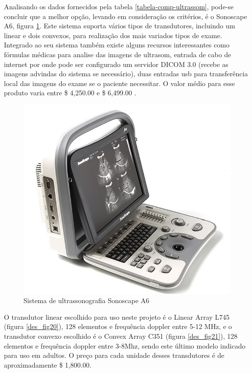 Analisando os dados fornecidos pela tabela \ref{tabela-comp-ultrassom}, pode-se concluir que a melhor opção, levando em consideração os critérios, é o Sonoscape A6, figura \ref{des_fig19}. Este sistema suporta vários tipos de transdutores, incluindo um linear e dois convexos, para realização dos mais variados tipos de exame. Integrado ao seu sistema também existe alguns recursos interessantes como fórmulas médicas para analise das imagens de ultrasom, entrada de cabo de internet por onde pode ser configurado um servidor DICOM 3.0 (recebe as imagens advindas do sistema se necessário), duas entradas usb para transferência local das imagens do exame se o paciente necessitar. O valor médio para esse produto varia entre \$ 4,250.00 e \$ 6,499.00 \cite{sonoscapea6}.
\begin{figure}[H]
	\centering	\includegraphics[keepaspectratio=true,scale=0.35]{figuras/sonoscapea6.jpg}
	\caption{Sistema de ultrassonografia Sonoscape A6}
	\label{des_fig19}
\end{figure}
O transdutor linear escolhido para uso neste projeto é o Linear Array L745 (figura \ref{des_fig20}), 128 elementos e frequência doppler entre 5-12 MHz,  e o transdutor convexo escolhido é o Convex Array C351 (figura \ref{des_fig21}), 128 elementos e frequência doppler entre 3-8Mhz, sendo este último modelo indicado para uso em adultos. O preço para cada unidade desses transdutores é de aproximadamente \$ 1,800.00.

